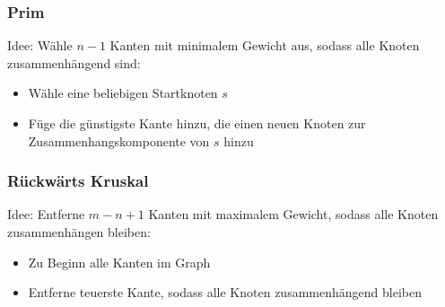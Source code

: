 	\subsubsection{Prim}
	Idee: Wähle $n-1$ Kanten mit minimalem Gewicht aus, sodass alle Knoten zusammenhängend sind:
	\begin{itemize}
	  \item Wähle eine beliebigen Startknoten $s$
	  \item Füge die günstigste Kante hinzu, die einen neuen Knoten zur Zusammenhangskomponente von $s$ hinzu
	\end{itemize}
	\subsubsection{Rückwärts Kruskal}
	Idee: Entferne $m-n+1$ Kanten mit maximalem Gewicht, sodass alle Knoten zusammenhängen bleiben:
	\begin{itemize}
	  \item Zu Beginn alle Kanten im Graph
	  \item Entferne teuerste Kante, sodass alle Knoten zusammenhängend bleiben
	\end{itemize}
